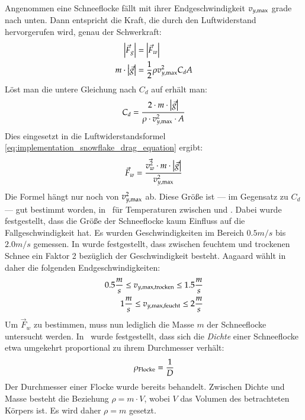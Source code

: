 Angenommen eine Schneeflocke fällt mit ihrer Endgeschwindigkeit
$v_{y,\textnormal{max}}$ grade nach unten. Dann
entspricht die Kraft, die durch den Luftwiderstand hervorgerufen wird,
genau der Schwerkraft:
\begin{align}
\left|\vec{F}_g\right| &= \left|\vec{F}_w\right| \\
m \cdot \left|\vec{g}\right| &= \frac{1}{2} \rho v_{y,\textnormal{max}}^2 C_d A
\end{align}
Löst man die untere Gleichung nach $C_d$ auf erhält man:
\begin{equation}
C_d
=
\frac
{
  2 \cdot m \cdot \left|\vec{g}\right|
}
{
  \rho \cdot v_{y,\textnormal{max}}^2 \cdot A
}
\end{equation}
Dies eingesetzt in die Luftwiderstandsformel
\ref{eq:implementation_snowflake_drag_equation} ergibt:
\begin{equation}
\vec{F}_w =
\frac
{
  \vec{v_w^2} \cdot m \cdot \left|\vec{g}\right|
}
{
  v_{y,\textnormal{max}}^2
}
\end{equation}
Die Formel hängt nur noch von $v_{y,\textnormal{max}}^2$
ab. Diese Größe ist --- im Gegensatz zu $C_d$ --- gut bestimmt worden,
\PimiddyzB{}in~\cite{Hanesch1966} für Temperaturen zwischen 
und . Dabei wurde festgestellt,
dass die Größe der Schneeflocke kaum Einfluss auf die
Fallgeschwindigkeit hat. Es wurden Geschwindigkeiten im Bereich $0.5m/s$
bis $2.0m/s$ gemessen. In
\cite{Centre1998} wurde festgestellt, dass zwischen feuchtem und
trockenen Schnee ein Faktor 2 bezüglich der Geschwindigkeit
besteht. Aagaard wählt in~\cite{Aagaard2004} daher die folgenden
Endgeschwindigkeiten:
\begin{align}
0.5 \frac{m}{s} \leq v_{y,\textnormal{max},\textnormal{trocken}} \leq 1.5 \frac{m}{s} \\
1 \frac{m}{s} \leq v_{y,\textnormal{max},\textnormal{feucht}} \leq 2 \frac{m}{s}
\end{align}
Um $\vec{F}_w$ zu bestimmen, muss nun lediglich die Masse $m$ der
Schneeflocke untersucht werden. In~\cite{Centre1998} wurde
festgestellt, dass sich die \emph{Dichte} einer Schneeflocke etwa
umgekehrt proportional zu ihrem Durchmesser verhält:
\begin{align}
\rho_{\textnormal{Flocke}} = \frac{1}{D}
\end{align}
Der Durchmesser einer Flocke wurde bereits behandelt. Zwischen
Dichte und Masse besteht die Beziehung $\rho = m \cdot V$, wobei $V$
das Volumen des betrachteten Körpers ist. Es wird daher $\rho = m$
gesetzt.

